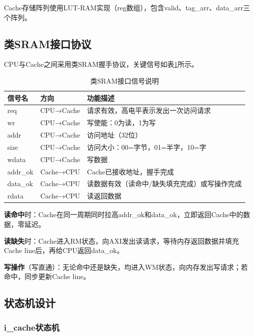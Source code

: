 Cache存储阵列使用LUT-RAM实现（reg数组），包含valid、tag\_arr、data\_arr三个阵列。

\subsection{类SRAM接口协议}

CPU与Cache之间采用类SRAM握手协议，关键信号如表\ref{tab:sram_sig}所示。

\begin{table}[htp]
\caption{类SRAM接口信号说明}
\label{tab:sram_sig}
\begin{center}
\begin{tabular}{|l|l|p{7cm}|}
\hline
\textbf{信号名} & \textbf{方向} & \textbf{功能描述} \\ \hline\hline
req      & CPU→Cache & 请求有效，高电平表示发出一次访问请求 \\ \hline
wr       & CPU→Cache & 写使能：0为读，1为写 \\ \hline
addr     & CPU→Cache & 访问地址（32位） \\ \hline
size     & CPU→Cache & 访问大小：00=字节，01=半字，10=字 \\ \hline
wdata    & CPU→Cache & 写数据 \\ \hline
addr\_ok & Cache→CPU & Cache已接收地址，握手完成 \\ \hline
data\_ok & Cache→CPU & 读数据有效（读命中/缺失填充完成）或写操作完成 \\ \hline
rdata    & Cache→CPU & 读返回数据 \\ \hline
\end{tabular}
\end{center}
\end{table}

\textbf{读命中}时：Cache在同一周期同时拉高addr\_ok和data\_ok，立即返回Cache中的数据，零延迟。

\textbf{读缺失}时：Cache进入RM状态，向AXI发出读请求，等待内存返回数据并填充Cache line后，再给CPU返回data\_ok。

\textbf{写操作}（写直通）：无论命中还是缺失，均进入WM状态，向内存发出写请求；若命中，同步更新Cache line。

\subsection{状态机设计}

\subsubsection{i\_cache状态机}

